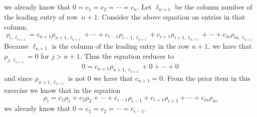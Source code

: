 \begin{exercises}
\begin{answer}
\begin{exparts}
\begin{equation*}
          \end{equation*}
          we already know that $0=c_1=c_2=\cdots =c_n$.
          Let $\ell_{n+1}$ be the column number of the leading entry of
          row~$n+1$. 
          Consider the above equation on entries in that column.
          \begin{equation*}
             \rho_{i,\ell_{n+1}}=c_{n+1}\rho_{n+1,\ell_{n+1}}+\cdots
                             +c_{i-1}\rho_{i-1,\ell_{n+1}}
                             +c_{i+1}\rho_{i+1,\ell_{n+1}}
                             +\cdots+c_m\rho_{m,\ell_{n+1}}
          \end{equation*}
          Because $\ell_{n+1}$ is the column of the leading entry in the
          row $n+1$, we have that $\rho_{j,\ell_{n+1}}=0$ for $j>{n+1}$.  
          Thus the equation reduces to  
          \begin{equation*}
             0=c_{n+1}\rho_{n+1,\ell_{n+1}}+0+\cdots+0
          \end{equation*}
          and since $\rho_{n+1,\ell_{n+1}}$ is not $0$ we have that $c_{n+1}=0$.
        \partsitem 
          From the prior item in this exercise we know that in the equation 
          \begin{equation*}
            \rho_i=c_1\rho_1+c_2\rho_2+\cdots+c_{i-1}\rho_{i-1}+
                     c_{i+1}\rho_{i+1}+\cdots+c_m\rho_m
          \end{equation*}
          we already know that $0=c_1=c_2=\cdots =c_{i-1}$.


\end{exparts}
\end{answer}
\end{exercises}
